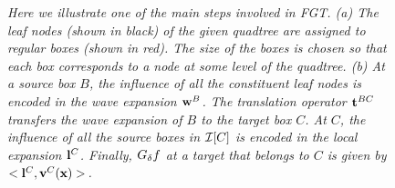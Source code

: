 \documentclass[conference]{IEEEtran}
\begin{document}
\begin{figure}
\begin{center}
 \end{center}
\caption{
 \label{fig:Grid} 
 \em Here we illustrate one of the main steps involved in FGT.  (a) The leaf nodes (shown in black) of the given quadtree 
  are assigned to regular boxes (shown in red). The size of the boxes
  is chosen so that each box corresponds to a node at some level of
  the quadtree. (b) At a source box $B$, the influence of all  
  the constituent leaf nodes is encoded in the wave expansion
  ${\mathbf{w}}^B$. The translation operator ${\mathbf{t}}^{BC}$ transfers the
   wave expansion of $B$ to the target box $C$. At $C$, the influence of all the source
  boxes in $\mathcal{I}[C]$ is encoded in the local expansion ${\mathbf{l}}^C$.
  Finally, $G_{\delta} f$ at a target that belongs to $C$ is given by 
  $<{\mathbf{l}}^C, {\mathbf{v}}^C(\mathbf{x})>$. }
\end{figure}
\end{document}
